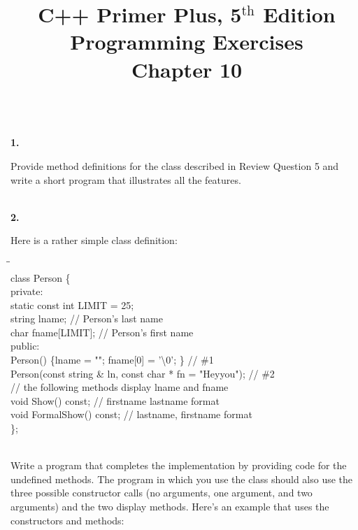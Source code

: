 \documentclass[10 pt]{amsart}
\newlength{\cwidth}
\newenvironment{cpart}[2][\cwidth]
	{\\ \phantom{\qquad}\textbf{#2. }\begin{minipage}[t]{#1}}
	{\end{minipage}}
\newcommand{\ChapNum}{10}
\begin{document}
	\title
	[Chapter \ChapNum]
	{C++ Primer Plus, 5$^\text{th}$ Edition \\
	Programming Exercises \\
	Chapter \ChapNum}

	\maketitle

	\begin{cpart}{1}
		Provide method definitions for the class described in 
		Review Question 5 and write a short program that illustrates
		all the features.
	\end{cpart}
	\vspace{2ex}

	\begin{cpart}{2}
		Here is a rather simple class definition:
		{\ttfamily
			\begin{tabbing}
				\phantom{\qquad}\=\hspace{5cm}\= \hspace{2 cm} \= \\
				class Person \{ \\
				private: \\
				\> 	static const int LIMIT = 25; \\
				\> 	string lname;  \> // Person's last name \\
				\> 	char fname[LIMIT];  \> // Person's first name \\
				public: \+ \\
				Person() \{lname = ""; fname[0] = '\textbackslash 0'; \} 
					// \#1 \\
				Person(const string \& ln, const char * fn = "Heyyou"); 
					// \#2 \\
				// the following methods display lname and fname \\
				void Show() const; \> // firstname lastname format \\
				void FormalShow() const; \> // lastname, firstname format
				\- \\
				\};
			\end{tabbing}
		}
		\phantom{\quad} \\
		Write a program that completes the implementation by providing
		code for the undefined methods.
		The program in which you use the class should also use the
		three possible constructor calls (no arguments, one argument, 
		and two arguments) and the two display methods.
		Here's an example that uses the constructors and methods:
		{\ttfamily
}
\end{cpart}
\end{document}
